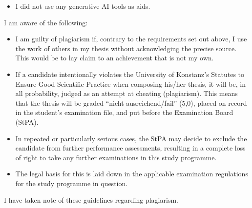 {\begin{itemize}
        
    \item[\mbox{\begin{Form}\CheckBox[height=0.2cm, width=0.2cm]{}\end{Form}}]I did not use any generative AI tools as aids.
\end{itemize}





\thispagestyle{page2}

I am aware of the following:

\begin{itemize}[label=\color{kon4}--]
\item I am guilty of plagiarism if, contrary to the requirements set out above, I use the work of others in my thesis without acknowledging the precise source. This would be to lay claim to an achievement that is not my own.

\item If a candidate intentionally violates the University of Konstanz's Statutes to Ensure Good Scientific Practice when composing his/her thesis, it will be, in all probability, judged as an attempt at cheating (plagiarism). This means that the thesis will be graded \enquote{nicht ausreichend/fail} (5,0), placed on record in the student's examination file, and put before the Examination Board (StPA).

\item In repeated or particularly serious cases, the StPA may decide to exclude the candidate from further performance assessments, resulting in a complete loss of right to take any further examinations in this study programme.

\item The legal basis for this is laid down in the applicable examination regulations for the study programme in question.
\end{itemize}

I have taken note of these guidelines regarding plagiarism.

\vspace{0.75cm}

}
